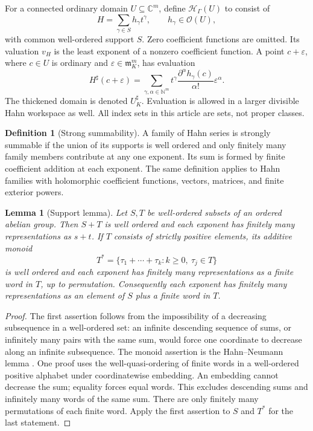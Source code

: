 \documentclass[11pt,letterpaper]{article}
\newtheorem{lemma}[theorem]{Lemma}
\theoremstyle{definition}
\newtheorem{definition}[theorem]{Definition}
\theoremstyle{remark}
\newcommand{\C}{\mathbb C}
\newcommand{\N}{\mathbb N}
\newcommand{\OO}{\mathcal O}
\newcommand{\HH}{\mathcal H}
\newcommand{\mm}{\mathfrak m}
\newcommand{\sh}{^{\sharp}}
\numberwithin{equation}{section}
\begin{document}
For a connected ordinary domain $U\subseteq\C^m$, define $\HH_\Gamma(U)$ to consist of
\begin{equation}\label{eq:coherent}
 H=\sum_{\gamma\in S}h_\gamma t^\gamma,
 \qquad h_\gamma\in\OO(U),
\end{equation}
with common well-ordered support $S$. Zero coefficient functions are omitted. Its valuation $v_H$ is the least exponent of a nonzero coefficient function. A point $c+\varepsilon$, where $c\in U$ is ordinary and $\varepsilon\in\mm_K^m$, has evaluation
\begin{equation}\label{eq:evaluation}
 H\sh(c+\varepsilon)=
 \sum_{\gamma,\alpha\in\N^m}
 t^\gamma\frac{\partial^\alpha h_\gamma(c)}{\alpha!}\varepsilon^\alpha.
\end{equation}
The thickened domain is denoted $U_K\sh$. Evaluation is allowed in a larger divisible Hahn workspace as well. All index sets in this article are sets, not proper classes.

\begin{definition}[Strong summability]
A family of Hahn series is strongly summable if the union of its supports is well ordered and only finitely many family members contribute at any one exponent. Its sum is formed by finite coefficient addition at each exponent. The same definition applies to Hahn families with holomorphic coefficient functions, vectors, matrices, and finite exterior powers.
\end{definition}

\begin{lemma}[Support lemma]\label{lem:support}
Let $S,T$ be well-ordered subsets of an ordered abelian group. Then $S+T$ is well ordered and each exponent has finitely many representations as $s+t$. If $T$ consists of strictly positive elements, its additive monoid
\[
 T^*=\{\tau_1+\cdots+\tau_k:k\ge0,\ \tau_j\in T\}
\]
is well ordered and each exponent has finitely many representations as a finite word in $T$, up to permutation. Consequently each exponent has finitely many representations as an element of $S$ plus a finite word in $T$.
\end{lemma}
\begin{proof}
The first assertion follows from the impossibility of a decreasing subsequence in a well-ordered set: an infinite descending sequence of sums, or infinitely many pairs with the same sum, would force one coordinate to decrease along an infinite subsequence. The monoid assertion is the Hahn--Neumann lemma \cite{Neumann}. One proof uses the well-quasi-ordering of finite words in a well-ordered positive alphabet under coordinatewise embedding. An embedding cannot decrease the sum; equality forces equal words. This excludes descending sums and infinitely many words of the same sum. There are only finitely many permutations of each finite word. Apply the first assertion to $S$ and $T^*$ for the last statement.
\end{proof}
\end{document}
